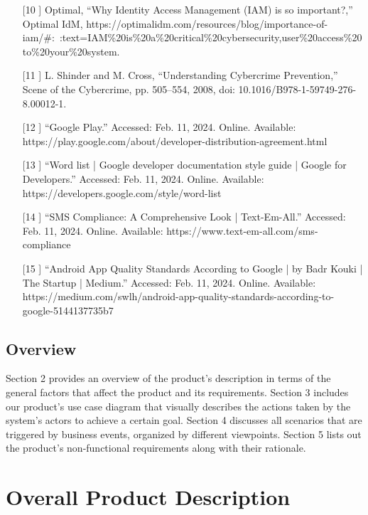 \documentclass[]{article}
\begin{document}
\begin{itemize}
	\item[[10]] Optimal, “Why Identity Access Management (IAM) is so important?,” Optimal IdM, https://optimalidm.com/resources/blog/importance-of-iam/\#:~:text=IAM\%20is\%20a\%20critical\%20cybersecurity,user\%20access\%20to\%20your\%20system.
	\item[[11]] L. Shinder and M. Cross, “Understanding Cybercrime Prevention,” Scene of the Cybercrime, pp. 505–554, 2008, doi: 10.1016/B978-1-59749-276-8.00012-1.
	\item[[12]] “Google Play.” Accessed: Feb. 11, 2024. Online.
	Available: https://play.google.com/about/developer-distribution-agreement.html
	\item[[13]] “Word list  |  Google developer documentation style guide  |  Google for Developers.” Accessed: Feb. 11, 2024. Online. Available: https://developers.google.com/style/word-list
	\item[[14]] “SMS Compliance: A Comprehensive Look | Text-Em-All.” Accessed: Feb. 11, 2024. Online. Available: https://www.text-em-all.com/sms-compliance
	\item[[15]] “Android App Quality Standards According to Google | by Badr Kouki | The Startup | Medium.” Accessed: Feb. 11, 2024. Online. Available: https://medium.com/swlh/android-app-quality-standards-according-to-google-5144137735b7

\end{itemize}

\subsection{Overview}
\label{sub:overview}
Section 2 provides an overview of the product’s description in terms of the general factors that affect the product and its requirements. Section 3 includes our product’s use case diagram that visually describes the actions taken by the system’s actors to achieve a certain goal. Section 4 discusses all scenarios that are triggered by business events, organized by different viewpoints. Section 5 lists out the product’s non-functional requirements along with their rationale.

\newpage
\section{Overall Product Description}
\label{sec:overall_description}
\end{document}
